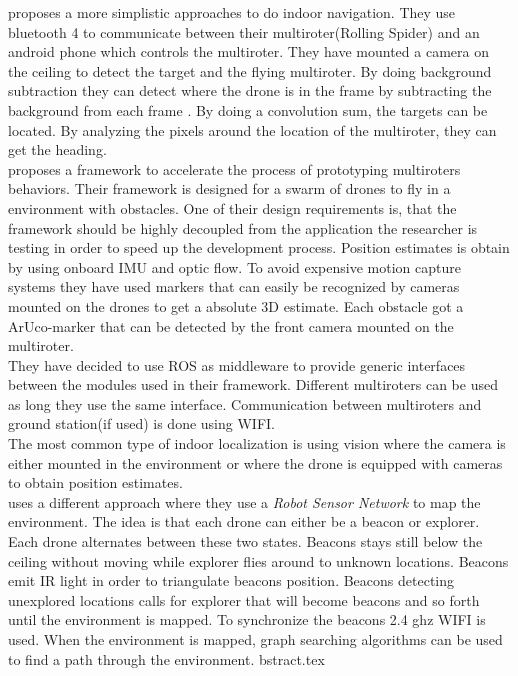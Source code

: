  
\cite{kang2015indoor} proposes a more simplistic approaches to do indoor navigation.
They use bluetooth 4 to communicate between their multiroter(Rolling Spider) and an android phone which controls the multiroter.
They have mounted a camera on the ceiling to detect the target and the flying multiroter.
By doing background subtraction they can detect where the drone is in the frame by subtracting the background from each frame \cite{wikiBackgroundsubtraction}. 
By doing a convolution sum, the targets can be located. By analyzing the pixels around the location of the multiroter, they can get the heading. \\

\cite{sanchez2014system} proposes a framework to accelerate the process of prototyping multiroters behaviors. Their framework is designed for a swarm of drones to fly in a environment with obstacles. One of their design requirements is, that the framework should be highly decoupled from the application the researcher is testing in order to speed up the development process. 
Position estimates is obtain by using onboard IMU and optic flow. To avoid expensive motion capture systems they have used markers that can easily be recognized by cameras mounted on the drones to get a absolute 3D estimate. Each obstacle got a ArUco-marker \cite{Aruco2014} that can be detected by the front camera mounted on the multiroter. \\
They have decided to use ROS as middleware to provide generic interfaces between the modules used in their framework. Different multiroters can be used as long they use the same interface. Communication between multiroters and ground station(if used) is done using WIFI. \\


The most common type of indoor localization is using vision where the camera is either mounted in the environment or where the drone is equipped with cameras to obtain position estimates.\\
\cite{stirling2012indoor} uses a different approach where they use a \textit{Robot Sensor Network} to map the environment.
The idea is that each drone can either be a beacon or explorer. Each drone alternates between these two states. Beacons stays still below the ceiling without moving while explorer flies around to unknown locations. Beacons emit IR light in order to triangulate beacons position.  Beacons detecting unexplored locations calls for explorer that will become beacons and so forth until the environment is mapped. To synchronize the beacons 2.4 ghz WIFI is used. When the environment is mapped, graph searching algorithms can be used to find a path through the environment.
bstract.tex
